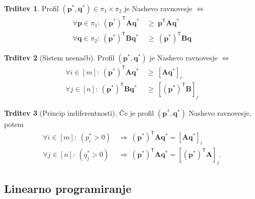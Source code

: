 \documentclass[11pt]{article}
\newcommand{\T}{\textsf{T}}
\newcommand{\p}{\mathbf{p}}
\newcommand{\q}{\mathbf{q}}
\renewcommand{\AA}{\mathbf{A}}
\newcommand{\BB}{\mathbf{B}}
\newcommand{\1}{\mathbbm{1}}
\theoremstyle{definition}
\theoremstyle{definition}
\newtheorem{trditev}{Trditev}[section]
\theoremstyle{definition}
\theoremstyle{definition}
\begin{document}
\begin{trditev}

Profil $(\p^*,\q^*) \in \pi_1 \times \pi_2$ je Nashevo ravnovesje $\iff$
\begin{align*}
\forall \p \in \pi_1: ~(\p^*)^\T \AA \q^* ~&\geq~ \p^\T \AA \q^* \\
\forall \q \in \pi_2: ~(\p^*)^\T \BB \q^* ~&\geq~ (\p^*)^\T \BB \q
\end{align*}

\end{trditev}
\vspace{0.5cm}

\begin{trditev}[Sistem neenačb]

Profil $(\p^*,\q^*)$ je Nashevo ravnovesje $\iff$
\begin{align*}
\forall i \in [m]: ~(\p^*)^\T \AA \q^* ~&\geq~ [\AA\q^*]_i \\
\forall j \in [n]: ~(\p^*)^\T \BB \q^* ~&\geq~ [(\p^*)^\T \BB]_j
\end{align*}

\end{trditev}
\vspace{0.5cm}

\begin{trditev}[Princip indiferentnosti]

Če je profil $(\p^*, \q^*)$ Nashevo ravnovesje, potem
\begin{align*}
\forall i \in [m]: ~(p_i^* > 0) ~&\Rightarrow~ (\p^*)^\T \AA \q^* = [\AA\q^*]_i \\
\forall j \in [n]: ~(q_j^* > 0) ~&\Rightarrow~ (\p^*)^\T \AA \q^* = [(\p^*)^\T \AA]_j.
\end{align*}

\end{trditev}
\vspace{0.5cm}


\subsection{Linearno programiranje}
\vspace{0.5cm}
\end{document}
